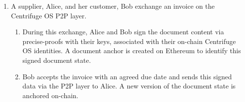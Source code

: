 \documentclass[a4paper, 10pt]{article}
\begin{document}
\begin{enumerate}
    \item A supplier, Alice, and her customer, Bob exchange an invoice on the Centrifuge OS P2P layer. 
    \begin{enumerate}
        \item During this exchange, Alice and Bob sign the document content via precise-proofs with their keys, associated with their on-chain Centrifuge OS identities. A document anchor is created on Ethereum to identify this signed document state. 
        \item Bob accepts the invoice with an agreed due date and sends this signed data via the P2P layer to Alice. A new version of the document state is anchored on-chain.
    \end{enumerate}
    

\end{enumerate}
\end{document}
